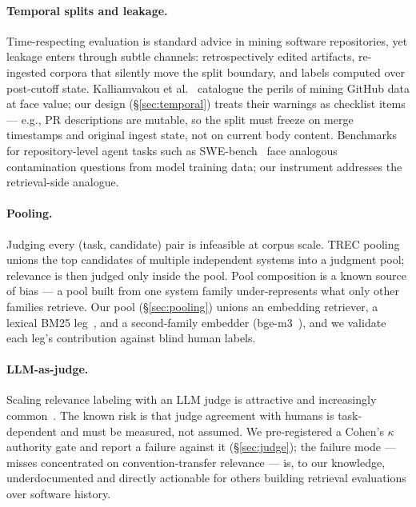 \documentclass[sigconf,nonacm]{acmart}
\begin{document}
\paragraph{Temporal splits and leakage.}
Time-respecting evaluation is standard advice in mining software
repositories, yet leakage enters through subtle channels: retrospectively
edited artifacts, re-ingested corpora that silently move the split
boundary, and labels computed over post-cutoff state. Kalliamvakou et
al.~\cite{kalliamvakou2014promises} catalogue the perils of mining GitHub
data at face value; our design (\S\ref{sec:temporal}) treats their
warnings as checklist items --- e.g., PR descriptions are mutable, so the
split must freeze on merge timestamps and original ingest state, not on
current body content. Benchmarks for repository-level agent tasks such as
SWE-bench~\cite{jimenez2024swebench} face analogous contamination
questions from model training data; our instrument addresses the
retrieval-side analogue.

\paragraph{Pooling.}
Judging every (task, candidate) pair is infeasible at corpus scale. TREC
pooling~\cite{voorhees2000variations,zobel1998reliable} unions the top
candidates of multiple independent systems into a judgment pool; relevance
is then judged only inside the pool. Pool composition is a known source of
bias --- a pool built from one system family under-represents what only
other families retrieve. Our pool (\S\ref{sec:pooling}) unions an
embedding retriever, a lexical BM25 leg~\cite{robertson2009bm25}, and a
second-family embedder (bge-m3~\cite{chen2024bge}), and we validate each
leg's contribution against blind human labels.

\paragraph{LLM-as-judge.}
Scaling relevance labeling with an LLM judge is attractive and increasingly
common~\cite{zheng2023judging}. The known risk is that judge agreement with
humans is task-dependent and must be measured, not assumed. We
pre-registered a Cohen's $\kappa$~\cite{cohen1960} authority gate and
report a failure against it (\S\ref{sec:judge}); the failure mode ---
misses concentrated on convention-transfer relevance --- is, to our
knowledge, underdocumented and directly actionable for others building
retrieval evaluations over software history.
\end{document}
